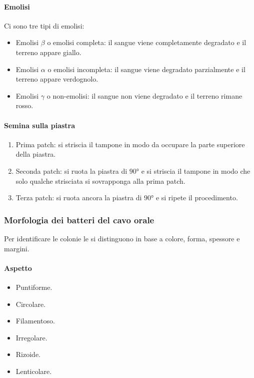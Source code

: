 			\paragraph{Emolisi}
			Ci sono tre tipi di emolisi:
			\begin{itemize}
				\item Emolisi $\beta$ o emolisi completa: il sangue viene completamente degradato e il terreno appare giallo.
				\item Emolisi $\alpha$ o emolisi incompleta: il sangue viene degradato parzialmente e il terreno appare verdognolo.
				\item Emolisi $\gamma$ o non-emolisi: il sangue non viene degradato e il terreno rimane rosso.
			\end{itemize}

			\paragraph{Semina sulla piastra}
			\begin{enumerate}
				\item Prima patch: si striscia il tampone in modo da occupare la parte superiore della piastra.
				\item Seconda patch: si ruota la piastra di $90\si{\degree}$ e si striscia il tampone in modo che solo qualche strisciata si sovrapponga alla prima patch.
				\item Terza patch: si ruota ancora la piastra di $90\si{\degree}$ e si ripete il procedimento.
			\end{enumerate}

		\subsubsection{Morfologia dei batteri del cavo orale}
		Per identificare le colonie le si distinguono in base a colore, forma, spessore e margini.

			\paragraph{Aspetto}\mbox{}
			\begin{multicols}{3}
				\begin{itemize}
					\item Puntiforme.
					\item Circolare.
					\item Filamentoso.
					\item Irregolare.
					\item Rizoide.
					\item Lenticolare.
				\end{itemize}
			\end{multicols}

